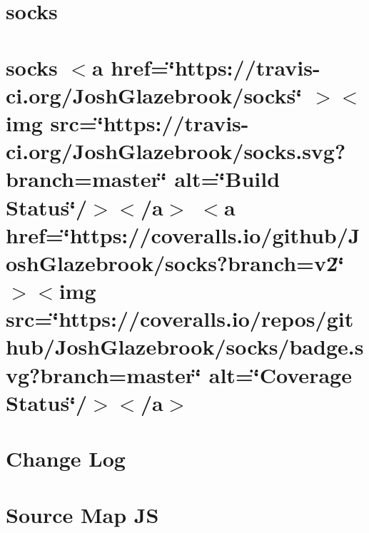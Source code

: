 \documentclass[twoside]{book}
\newcommand{\+}{\discretionary{\mbox{\scriptsize$\hookleftarrow$}}{}{}}
\begin{document}
\chapter{socks}
\label{md__c___users_vaishnavi_jadhav__desktop__developer_code_mean_stack_example_client_node_modules_socks_docs_migrating_from_v1}

\chapter{socks \texorpdfstring{$<$}{<}a href=\char`\"{}https\+://travis-\/ci.\+org/\+Josh\+Glazebrook/socks\char`\"{} \texorpdfstring{$>$}{>}\texorpdfstring{$<$}{<}img src=\char`\"{}https\+://travis-\/ci.\+org/\+Josh\+Glazebrook/socks.\+svg?branch=master\char`\"{} alt=\char`\"{}\+Build Status\char`\"{}/\texorpdfstring{$>$}{>}\texorpdfstring{$<$}{<}/a\texorpdfstring{$>$}{>} \texorpdfstring{$<$}{<}a href=\char`\"{}https\+://coveralls.\+io/github/\+Josh\+Glazebrook/socks?branch=v2\char`\"{} \texorpdfstring{$>$}{>}\texorpdfstring{$<$}{<}img src=\char`\"{}https\+://coveralls.\+io/repos/github/\+Josh\+Glazebrook/socks/badge.\+svg?branch=master\char`\"{} alt=\char`\"{}\+Coverage Status\char`\"{}/\texorpdfstring{$>$}{>}\texorpdfstring{$<$}{<}/a\texorpdfstring{$>$}{>}}
\label{md__c___users_vaishnavi_jadhav__desktop__developer_code_mean_stack_example_client_node_modules_socks__r_e_a_d_m_e}

\chapter{Change Log}
\label{md__c___users_vaishnavi_jadhav__desktop__developer_code_mean_stack_example_client_node_modules_source_map_js__c_h_a_n_g_e_l_o_g}

\chapter{Source Map JS}
\label{md__c___users_vaishnavi_jadhav__desktop__developer_code_mean_stack_example_client_node_modules_source_map_js__r_e_a_d_m_e}

\end{document}
